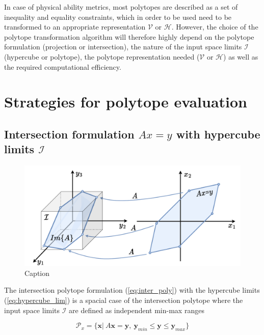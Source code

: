 In case of physical ability metrics, most polytopes are described as a set of inequality and equality constraints, which in order to be used need to be transformed to an appropriate representation $\mathcal{V}$ or $\mathcal{H}$. However, the choice of the polytope transformation algorithm will therefore highly depend on the polytope formulation (projection or intersection), the nature of the input space limits $\mathcal{I}$ (hypercube or polytope), the polytope representation needed ($\mathcal{V}$ or $\mathcal{H}$) as well as the required computational efficiency.


\section{Strategies for polytope evaluation}
\subsection{Intersection formulation $Ax=y$ with hypercube limits $\mathcal{I}$}

\begin{figure}[!htb]
    \centering
    \includegraphics[width=0.8\linewidth]{Chapters/imgs/intersection.pdf}
    \caption{Caption}
    \label{fig:inter}
\end{figure}

The intersection polytope formulation (\ref{eq:inter_poly}) with the hypercube limits (\ref{eq:hypercube_lim}) is a spacial case of the intersection polytope where the input space limits $\mathcal{I}$ are defined as independent min-max ranges 

\begin{equation}
    \mathcal{P}_x=\{\bm{x} |~ A\bm{x} = \bm{y},~\bm{y}_{min} \leq  \bm{y} \leq \bm{y}_{max}  \}
    \label{eq:inter_hyp}
\end{equation}


